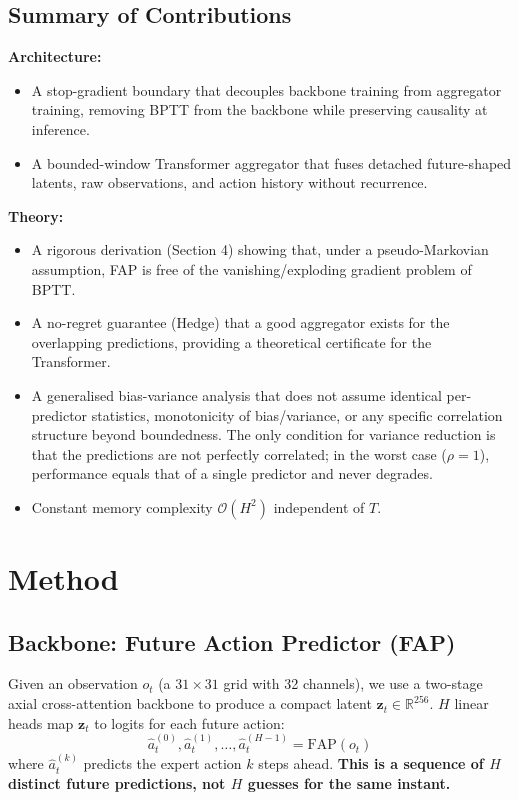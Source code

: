 \documentclass[11pt]{article}
\begin{document}
\subsection{Summary of Contributions}
\textbf{Architecture:}
\begin{itemize}
    \item A stop-gradient boundary that decouples backbone training from aggregator training, removing BPTT from the backbone while preserving causality at inference.
    \item A bounded-window Transformer aggregator that fuses detached future-shaped latents, raw observations, and action history without recurrence.
\end{itemize}
\textbf{Theory:}
\begin{itemize}
    \item A rigorous derivation (Section 4) showing that, under a pseudo-Markovian assumption, FAP is free of the vanishing/exploding gradient problem of BPTT.
    \item A no-regret guarantee (Hedge) that a good aggregator exists for the overlapping predictions, providing a theoretical certificate for the Transformer.
    \item A generalised bias-variance analysis that does not assume identical per-predictor statistics, monotonicity of bias/variance, or any specific correlation structure beyond boundedness. The only condition for variance reduction is that the predictions are not perfectly correlated; in the worst case (\(\rho=1\)), performance equals that of a single predictor and never degrades.
    \item Constant memory complexity \(\mathcal{O}(H^2)\) independent of \(T\).
\end{itemize}

\section{Method}

\subsection{Backbone: Future Action Predictor (FAP)}
Given an observation \(o_t\) (a \(31\times31\) grid with 32 channels), we use a two-stage axial cross-attention backbone to produce a compact latent \(\mathbf{z}_t \in \mathbb{R}^{256}\). \(H\) linear heads map \(\mathbf{z}_t\) to logits for each future action:
\[
\hat{a}_t^{(0)}, \hat{a}_t^{(1)}, \ldots, \hat{a}_t^{(H-1)} = \text{FAP}(o_t)
\]
where \(\hat{a}_t^{(k)}\) predicts the expert action \(k\) steps ahead. \textbf{This is a sequence of \(H\) distinct future predictions, not \(H\) guesses for the same instant.}
\end{document}
